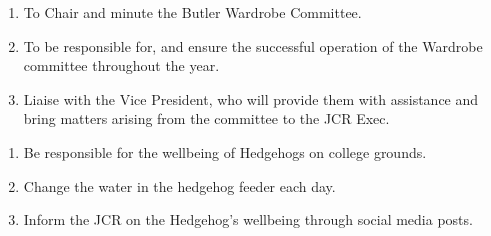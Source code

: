 \begin{enumerate}
    \item To Chair and minute the Butler Wardrobe Committee.
    \item To be responsible for, and ensure the successful operation of the Wardrobe committee throughout the year.
    \item Liaise with the Vice President, who will provide them with assistance and bring matters arising from the committee to the JCR Exec.
\end{enumerate}

\begin{enumerate}
    \item Be responsible for the wellbeing of Hedgehogs on college grounds.
    \item Change the water in the hedgehog feeder each day.
    \item Inform the JCR on the Hedgehog's wellbeing through social media posts.
\end{enumerate}
